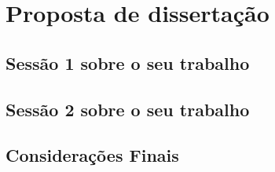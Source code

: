 \chapter{Proposta de dissertação}\label{cap:miolo}


\section{Sessão 1 sobre o seu trabalho}

\section{Sessão 2 sobre o seu trabalho}

\section{Considerações Finais}
